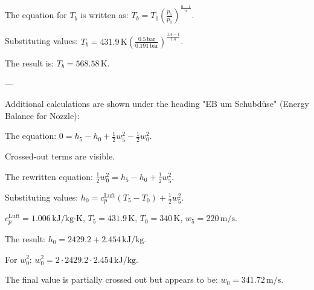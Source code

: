 The equation for \( T_b \) is written as:  
\( T_b = T_0 \left( \frac{p_5}{p_0} \right)^{\frac{n-1}{n}} \).  

Substituting values:  
\( T_b = 431.9 \, \text{K} \left( \frac{0.5 \, \text{bar}}{0.191 \, \text{bar}} \right)^{\frac{1.4-1}{1.4}} \).  

The result is:  
\( T_b = 568.58 \, \text{K} \).  

---

Additional calculations are shown under the heading "EB um Schubdüse" (Energy Balance for Nozzle):  

The equation:  
\( 0 = h_5 - h_0 + \frac{1}{2} w_5^2 - \frac{1}{2} w_0^2 \).  

Crossed-out terms are visible.  

The rewritten equation:  
\( \frac{1}{2} w_0^2 = h_5 - h_0 + \frac{1}{2} w_5^2 \).  

Substituting values:  
\( h_0 = c_p^{\text{Luft}} (T_5 - T_0) + \frac{1}{2} w_5^2 \).  

\( c_p^{\text{Luft}} = 1.006 \, \text{kJ/kg·K} \), \( T_5 = 431.9 \, \text{K} \), \( T_0 = 340 \, \text{K} \), \( w_5 = 220 \, \text{m/s} \).  

The result:  
\( h_0 = 2429.2 + 2.454 \, \text{kJ/kg} \).  

For \( w_0^2 \):  
\( w_0^2 = 2 \cdot 2429.2 \cdot 2.454 \, \text{kJ/kg} \).  

The final value is partially crossed out but appears to be:  
\( w_0 = 341.72 \, \text{m/s} \).